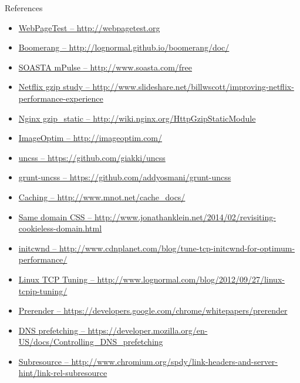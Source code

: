 \documentclass{beamer}
\begin{document}
\begin{frame}{References}
\begin{itemize}
  \item \tiny \href{http://webpagetest.org}{WebPageTest -- http://webpagetest.org}
  \item \tiny \href{http://lognormal.github.io/boomerang/doc/}{Boomerang -- http://lognormal.github.io/boomerang/doc/}
  \item \tiny \href{http://www.soasta.com/free}{SOASTA mPulse -- http://www.soasta.com/free}
  \item \tiny \href{http://www.slideshare.net/billwscott/improving-netflix-performance-experience}{Netflix gzip study -- http://www.slideshare.net/billwscott/improving-netflix-performance-experience}
  \item \tiny \href{http://wiki.nginx.org/HttpGzipStaticModule}{Nginx gzip\_static -- http://wiki.nginx.org/HttpGzipStaticModule}
  \item \tiny \href{http://imageoptim.com/}{ImageOptim -- http://imageoptim.com/}
  \item \tiny \href{https://github.com/giakki/uncss}{uncss -- https://github.com/giakki/uncss}
  \item \tiny \href{https://github.com/addyosmani/grunt-uncss}{grunt-uncss -- https://github.com/addyosmani/grunt-uncss}
  \item \tiny \href{http://www.mnot.net/cache_docs/}{Caching -- http://www.mnot.net/cache\_docs/}
  \item \tiny \href{http://www.jonathanklein.net/2014/02/revisiting-cookieless-domain.html}{Same domain CSS -- http://www.jonathanklein.net/2014/02/revisiting-cookieless-domain.html}
  \item \tiny \href{http://www.cdnplanet.com/blog/tune-tcp-initcwnd-for-optimum-performance/}{initcwnd -- http://www.cdnplanet.com/blog/tune-tcp-initcwnd-for-optimum-performance/}
  \item \tiny \href{http://www.lognormal.com/blog/2012/09/27/linux-tcpip-tuning/}{Linux TCP Tuning -- http://www.lognormal.com/blog/2012/09/27/linux-tcpip-tuning/}
  \item \tiny \href{https://developers.google.com/chrome/whitepapers/prerender}{Prerender -- https://developers.google.com/chrome/whitepapers/prerender}
  \item \tiny \href{https://developer.mozilla.org/en-US/docs/Controlling_DNS_prefetching}{DNS prefetching -- https://developer.mozilla.org/en-US/docs/Controlling\_DNS\_prefetching}
  \item \tiny \href{http://www.chromium.org/spdy/link-headers-and-server-hint/link-rel-subresource}{Subresource -- http://www.chromium.org/spdy/link-headers-and-server-hint/link-rel-subresource}

\end{itemize}
\end{frame}
\end{document}
